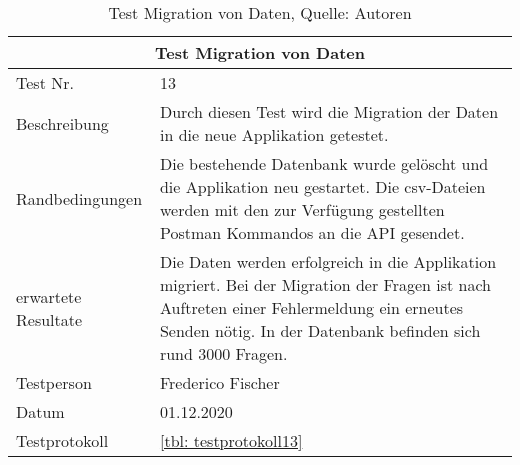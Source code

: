 \begin{table}[H]
\begin{tabularx}{\textwidth}{lX}
  \hline
  \multicolumn{2}{|c|}{Test Migration von Daten} \\
  \hline
  Test Nr. & 13\\
  Beschreibung & Durch diesen Test wird die Migration der Daten in die neue Applikation getestet.  \\
  Randbedingungen & Die bestehende Datenbank wurde gelöscht und die Applikation neu gestartet.  Die csv-Dateien werden mit den zur Verfügung gestellten Postman Kommandos an die API gesendet.  \\
  erwartete Resultate & Die Daten werden erfolgreich in die Applikation migriert.  Bei der Migration der Fragen ist nach Auftreten einer Fehlermeldung ein erneutes Senden nötig. In der Datenbank befinden sich rund 3000 Fragen. \\
  Testperson & Frederico Fischer \\
  Datum & 01.12.2020 \\
  Testprotokoll & \ref{tbl: testprotokoll13}\\
   \hline
\end{tabularx}
\caption{ \label{tbl: Test Migration von Daten}Test Migration von Daten, Quelle: Autoren}
\end{table}
\newpage
